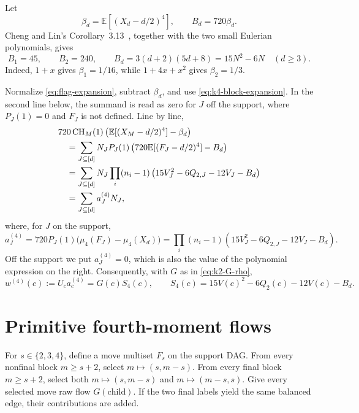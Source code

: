 \documentclass[11pt]{amsart}
\theoremstyle{definition}
\theoremstyle{remark}
\newcommand{\CH}{\operatorname{CH}}
\newcommand{\E}{\mathbb E}
\begin{document}
Let
\[
 \beta_d=\E[(X_d-d/2)^4],\qquad B_d=720\beta_d.
\]
Cheng and Lin's Corollary~3.13~\cite[pp.~13--14]{ChengLin}, together with
the two small Eulerian polynomials, gives
\begin{equation}
 B_1=45,\qquad B_2=240,\qquad
 B_d=3(d+2)(5d+8)=15N^2-6N\quad(d\ge3).
 \label{eq:Bd}
\end{equation}
Indeed, $1+x$ gives $\beta_1=1/16$, while
$1+4x+x^2$ gives $\beta_2=1/3$.

Normalize \eqref{eq:flag-expansion}, subtract $\beta_d$, and use
\eqref{eq:k4-block-expansion}.  In the second line below, the summand is
read as zero for $J$ off the support, where $P_J(1)=0$ and $F_J$ is not
defined.  Line by line,
\begin{align}
 &720\CH_M(1)\left(
   \E[(X_M-d/2)^4]-\beta_d\right)\notag\\
 &\quad=\sum_{J\subseteq[d]}N_JP_J(1)
 \left(720\E[(F_J-d/2)^4]-B_d\right)\notag\\
 &\quad=\sum_{J\subseteq[d]}N_J\prod_i(n_i-1)
 \left(15V_J^2-6Q_{2,J}-12V_J-B_d\right)\notag\\
 &\quad=\sum_{J\subseteq[d]}a_J^{(4)}N_J,
 \label{eq:k4-flag-form}
\end{align}
where, for $J$ on the support,
\begin{equation}
 a_J^{(4)}
 =720P_J(1)\bigl(\mu_4(F_J)-\mu_4(X_d)\bigr)
 =\prod_i(n_i-1)
 \left(15V_J^2-6Q_{2,J}-12V_J-B_d\right).
 \label{eq:a4}
\end{equation}
Off the support we put $a_J^{(4)}=0$, which is also the value of the
polynomial expression on the right.  Consequently, with $G$ as in
\eqref{eq:k2-G-rho},
\begin{equation}
 w^{(4)}(c):=U_ca_c^{(4)}
 =G(c)S_4(c),\qquad
 S_4(c)=15V(c)^2-6Q_2(c)-12V(c)-B_d.
 \label{eq:k4-target}
\end{equation}

\section{Primitive fourth-moment flows}
\label{sec:k4-primitives}

For $s\in\{2,3,4\}$, define a move multiset $F_s$ on the support DAG.
From every nonfinal block $m\ge s+2$, select
$m\mapsto(s,m-s)$.  From every final block $m\ge s+2$, select both
$m\mapsto(s,m-s)$ and $m\mapsto(m-s,s)$.  Give every selected move raw
flow $G(\text{child})$.  If the two final labels yield the same balanced
edge, their contributions are added.
\end{document}
